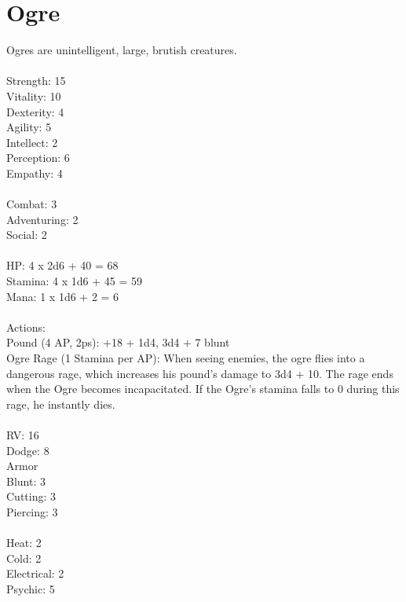 \section{Ogre}

Ogres are unintelligent, large, brutish creatures.\\
\\
Strength: 15\\
Vitality: 10\\
Dexterity: 4\\
Agility: 5\\
Intellect: 2\\
Perception: 6\\
Empathy: 4\\
\\
Combat: 3\\
Adventuring: 2\\
Social: 2\\
\\
HP: 4 x 2d6 + 40 = 68\\
Stamina: 4 x 1d6 + 45 = 59\\
Mana: 1 x 1d6 + 2 = 6\\
\\
Actions:\\
Pound (4 AP, 2ps): +18 + 1d4, 3d4 + 7 blunt\\
Ogre Rage (1 Stamina per AP): When seeing enemies, the ogre flies into a dangerous rage, which increases his pound's damage to 3d4 + 10. The rage ends when the Ogre becomes incapacitated. If the Ogre's stamina falls to 0 during this rage, he instantly dies.\\
\\
RV: 16\\
Dodge: 8\\
Armor\\
Blunt: 3\\
Cutting: 3\\
Piercing: 3\\
\\
Heat: 2\\
Cold: 2\\
Electrical: 2\\
Psychic: 5\\